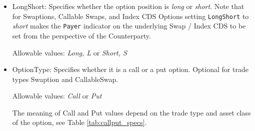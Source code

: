 \begin{itemize}
\item LongShort: Specifies whether the option position is \emph{long}  or \emph{short}.  Note that for Swaptions, Callable Swaps, and Index CDS Options setting \lstinline!LongShort! to \emph{short} makes the \lstinline!Payer! indicator on the underlying Swap / Index CDS to be set from the perspective of the Counterparty. 

Allowable values: \emph{Long, L} or \emph{Short, S}

\item OptionType: Specifies whether it is a call or a put option. Optional for trade types Swaption and CallableSwap.

Allowable values: \emph{Call} or \emph{Put} 

The meaning of Call and Put values depend on the trade type and asset class of the option, see Table \ref{tab:callput_specs}.


\end{itemize}
